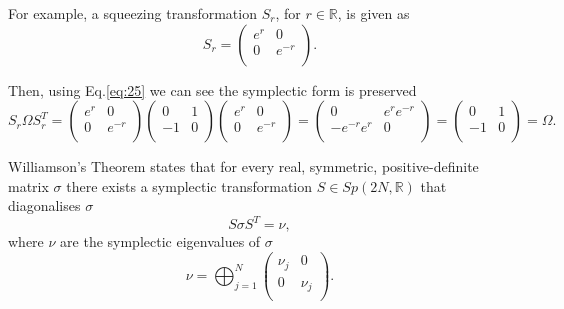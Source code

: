 \documentclass[11pt,a4paper]{article}
\numberwithin{equation}{section}
\begin{document}
	For example, a squeezing transformation $S_r$, for $r \in \mathbb{R}$, is given as
	\begin{equation*}
	S_r = \begin{pmatrix}
	e^r & 0  \\
	0 & e^{-r} \\
	\end{pmatrix}.
	\end{equation*}
	
	Then, using Eq.\ref{eq:25} we can see the symplectic form is preserved
	\begin{equation*}
	S_r\Omega S_r^{T} = \begin{pmatrix}
	e^r & 0  \\
	0 & e^{-r} \\
	\end{pmatrix}
	\begin{pmatrix}
	0 & 1  \\
	-1 & 0 \\
	\end{pmatrix}
	\begin{pmatrix}
	e^r & 0  \\
	0 & e^{-r} \\
	\end{pmatrix}  = \begin{pmatrix}
	0 & e^re^{-r}  \\
	-e^{-r}e^r & 0 \\
	\end{pmatrix} = \begin{pmatrix}
	0 & 1 \\
	-1 & 0 \\
	\end{pmatrix} = \Omega .
	\end{equation*}
	
	Williamson's Theorem \cite{Williamson36} states that for every real, symmetric, positive-definite matrix  $\sigma$ there exists a symplectic transformation $S \in Sp(2N, \mathbb{R})$ that diagonalises $\sigma$
	\begin{equation} \label{eq:27}
	S\sigma S^T = \nu,
	\end{equation}
	where $\nu$ are the symplectic eigenvalues of $\sigma$ 
	\begin{equation} \label{eq:28}
	\nu = \bigoplus_{j=1}^{N} 
	\begin{pmatrix}
	\nu_j & 0  \\
	0 & \nu_j \\
	\end{pmatrix}.
	\end{equation}
	
\end{document}
